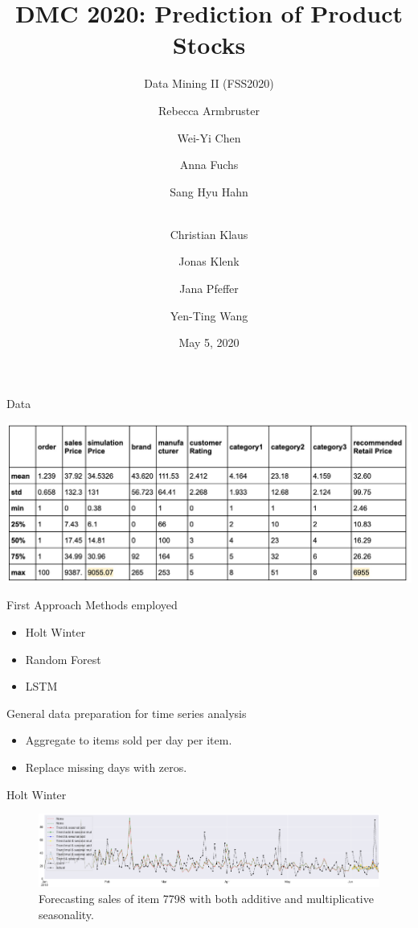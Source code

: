 \documentclass[10pt, xcolor=dvipsnames]{beamer}
\title{\large DMC 2020: Prediction of Product Stocks}
\subtitle{\normalsize Data Mining II (FSS2020)}
\author{\scriptsize Rebecca Armbruster \and
	Wei-Yi Chen \and
	Anna Fuchs \and Sang Hyu Hahn
	\and \\Christian Klaus
	\and Jonas Klenk
	\and Jana Pfeffer
	\and Yen-Ting Wang}
\institute{Team abraca-data}
\date{\small{May 5, 2020}}
\begin{document}
	
\setlength\tabcolsep{1.5pt}
\maketitle
\begin{frame}{Data}
\begin{centering}
\includegraphics[width=\textwidth]{data.jpg}
\end{centering}
\end{frame}

\begin{frame}{First Approach}
\alert{Methods employed}
        \begin{itemize}
	\item Holt Winter
	\item Random Forest
	\item LSTM
        \end{itemize}
\alert{General data preparation for time series analysis}
\begin{itemize}
	\item Aggregate to items sold per day per item.
	\item Replace missing days with zeros.
\end{itemize}
\end{frame}

\begin{frame}{Holt Winter}
\begin{figure}
\includegraphics[width=\textwidth]{holt.png}
\caption{\scriptsize Forecasting sales of item 7798 with both additive and multiplicative seasonality.}
\end{figure}

\end{frame}
\end{document}
